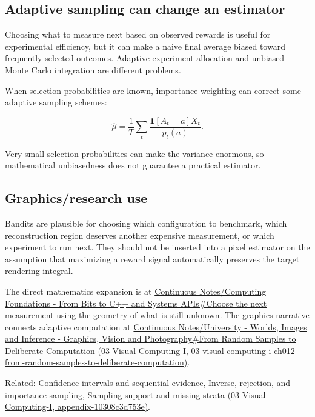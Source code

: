 \subsection{Adaptive sampling can change an estimator}\label{appendix-3dc863dbddf3-adaptive-sampling-can-change-an-estimator}

Choosing what to measure next based on observed rewards is useful for experimental efficiency, but it can make a naive final average biased toward frequently selected outcomes. Adaptive experiment allocation and unbiased Monte Carlo integration are different problems.

When selection probabilities are known, importance weighting can correct some adaptive sampling schemes:

\[
\hat\mu=
\frac1T\sum_t
\frac{\mathbf 1[A_t=a]X_t}{p_t(a)}.
\]

Very small selection probabilities can make the variance enormous, so mathematical unbiasedness does not guarantee a practical estimator.

\subsection{Graphics/research use}\label{appendix-3dc863dbddf3-graphicsresearch-use}

Bandits are plausible for choosing which configuration to benchmark, which reconstruction region deserves another expensive measurement, or which experiment to run next. They should not be inserted into a pixel estimator on the assumption that maximizing a reward signal automatically preserves the target rendering integral.

The direct mathematics expansion is at \hyperref[02-foundations-ii-ch030-choose-the-next-measurement-using-the-geometry-of-what-is-still-unknown]{Continuous Notes/Computing Foundations - From Bits to C++ and Systems APIs\#Choose the next measurement using the geometry of what is still unknown}. The graphics narrative connects adaptive computation at \href{../03-Visual-Computing-I/main.pdf\#nameddest=03-visual-computing-i-ch012-from-random-samples-to-deliberate-computation}{Continuous Notes/University - Worlds, Images and Inference - Graphics, Vision and Photography\#From Random Samples to Deliberate Computation (03-Visual-Computing-I, 03-visual-computing-i-ch012-from-random-samples-to-deliberate-computation)}.

Related: \hyperref[appendix-c83016554b1e]{Confidence intervals and sequential evidence}, \hyperref[appendix-8d863ed954d0]{Inverse, rejection, and importance sampling}, \href{../03-Visual-Computing-I/main.pdf\#nameddest=appendix-10308c3d753e}{Sampling support and missing strata (03-Visual-Computing-I, appendix-10308c3d753e)}.
